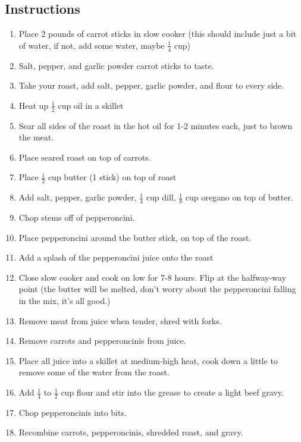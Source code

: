 \begin{multicols}{2}
\subsection*{Instructions}
\begin{enumerate}
    \item Place 2 pounds of carrot sticks in slow cooker (this should include just a bit of water, if not, add some water, maybe \( \frac{1}{4} \) cup)
    \item Salt, pepper, and garlic powder carrot sticks to taste.
    \item Take your roast, add salt, pepper, garlic powder, and flour to every side.
    \item Heat up \( \frac{1}{2} \) cup oil in a skillet
    \item Sear all sides of the roast in the hot oil for 1-2 minutes each, just to brown the meat.
    \item Place seared roast on top of carrots.
    \item Place \( \frac{1}{2} \) cup butter (1 stick) on top of roast
    \item Add salt, pepper, garlic powder, \( \frac{1}{4} \) cup dill, \( \frac{1}{8} \) cup oregano on top of butter.
    \item Chop stems off of pepperoncini.
    \item Place pepperoncini around the butter stick, on top of the roast.
    \item Add a splash of the pepperoncini juice onto the roast
    \item Close slow cooker and cook on low for 7-8 hours. Flip at the halfway-way point (the butter will be melted, don’t worry about the pepperoncini falling in the mix, it’s all good.)
    \item Remove meat from juice when tender, shred with forks.
    \item Remove carrots and pepperoncinis from juice.
    \item Place all juice into a skillet at medium-high heat, cook down a little to remove some of the water from the roast.
    \item Add \( \frac{1}{4} \) to \( \frac{1}{2} \) cup flour and stir into the grease to create a light beef gravy.
    \item Chop pepperoncinis into bits.
    \item Recombine carrots, pepperoncinis, shredded roast, and gravy.
\end{enumerate}


\end{multicols}
